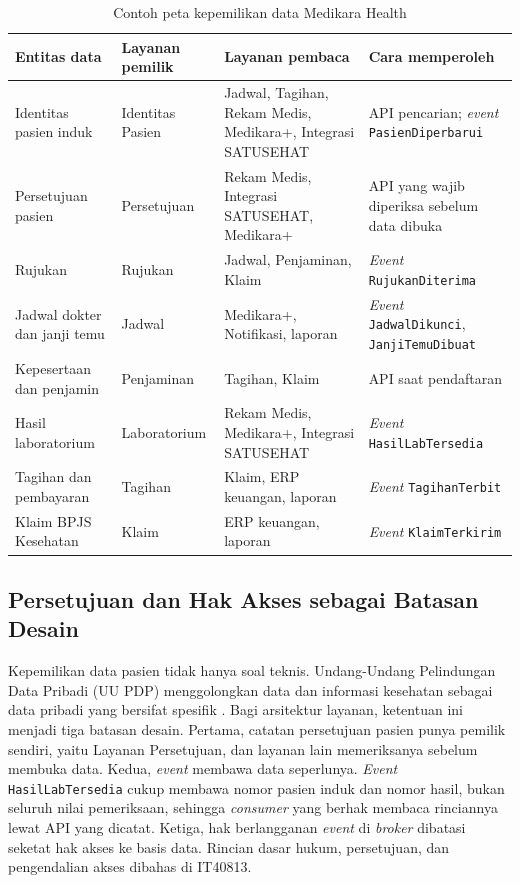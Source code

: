 \begin{table}[!htb]
  \centering
  \caption{Contoh peta kepemilikan data Medikara Health}
  \label{tab:ch10-peta-kepemilikan}
  \footnotesize
  \begin{tabularx}{\textwidth}{>{\raggedright\arraybackslash}p{2.3cm} >{\raggedright\arraybackslash}p{2.0cm} >{\raggedright\arraybackslash}X >{\raggedright\arraybackslash}X}
    \hline
    \textbf{Entitas data} & \textbf{Layanan pemilik} & \textbf{Layanan pembaca} & \textbf{Cara
      memperoleh} \\ \hline
    Identitas pasien induk & Identitas Pasien & Jadwal, Tagihan, Rekam Medis, Medikara+,
      Integrasi SATUSEHAT & API pencarian; \textit{event} \texttt{PasienDiperbarui} \\ \hline
    Persetujuan pasien & Persetujuan & Rekam Medis, Integrasi SATUSEHAT, Medikara+ & API yang
      wajib diperiksa sebelum data dibuka \\ \hline
    Rujukan & Rujukan & Jadwal, Penjaminan, Klaim & \textit{Event} \texttt{RujukanDiterima} \\
      \hline
    Jadwal dokter dan janji temu & Jadwal & Medikara+, Notifikasi, laporan & \textit{Event}
      \texttt{JadwalDikunci}, \texttt{JanjiTemuDibuat} \\ \hline
    Kepesertaan dan penjamin & Penjaminan & Tagihan, Klaim & API saat pendaftaran \\ \hline
    Hasil laboratorium & Laboratorium & Rekam Medis, Medikara+, Integrasi SATUSEHAT &
      \textit{Event} \texttt{HasilLabTersedia} \\ \hline
    Tagihan dan pembayaran & Tagihan & Klaim, ERP keuangan, laporan & \textit{Event}
      \texttt{TagihanTerbit} \\ \hline
    Klaim BPJS Kesehatan & Klaim & ERP keuangan, laporan & \textit{Event} \texttt{KlaimTerkirim}
      \\ \hline
  \end{tabularx}
\end{table}

\subsection{Persetujuan dan Hak Akses sebagai Batasan Desain}

Kepemilikan data pasien tidak hanya soal teknis. Undang-Undang Pelindungan Data Pribadi (UU PDP)
menggolongkan data dan informasi kesehatan sebagai data pribadi yang bersifat spesifik
\cite{uu27-2022-pdp}. Bagi arsitektur layanan, ketentuan ini menjadi tiga batasan desain. Pertama,
catatan persetujuan pasien punya pemilik sendiri, yaitu Layanan Persetujuan, dan layanan lain
memeriksanya sebelum membuka data. Kedua, \textit{event} membawa data seperlunya. \textit{Event}
\texttt{HasilLabTersedia} cukup membawa nomor pasien induk dan nomor hasil, bukan seluruh nilai
pemeriksaan, sehingga \textit{consumer} yang berhak membaca rinciannya lewat API yang dicatat.
Ketiga, hak berlangganan \textit{event} di \textit{broker} dibatasi seketat hak akses ke basis data.
Rincian dasar hukum, persetujuan, dan pengendalian akses dibahas di IT40813.

